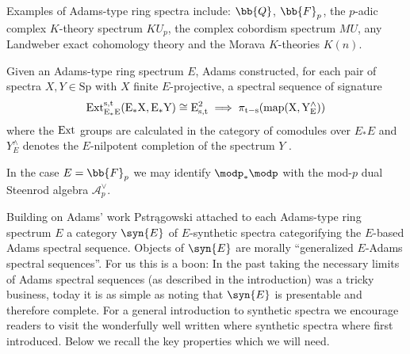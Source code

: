 \begin{ex}
    Examples of Adams-type ring spectra include:
    $\bb{Q}$, 
    $\bb{F}_p$,
    the $p$-adic complex $K$-theory spectrum $KU_p$,
    the complex cobordism spectrum $MU$, 
    any Landweber exact cohomology theory and
    the Morava $K$-theories $K(n)$.
\end{ex}

Given an Adams-type ring spectrum $E$, Adams constructed, for each pair of spectra $X, Y \in \mathrm{Sp}$ with $X$ finite $E$-projective, a spectral sequence of signature
$$ \rm{Ext}^{s,t}_{E_{*}E}(E_{*}X,E_{*}Y) \cong E^{2}_{s,t} \implies \pi_{t-s}(\rm{map}(X,Y^{\wedge}_{E}))$$
where the $\rm{Ext}$ groups are calculated in the category of comodules over $E_{*}E$ and $Y^{\wedge}_{E}$ denotes the $E$-nilpotent completion of the spectrum $Y$ \cite{adams1974stable}.  

\begin{ex}
    In the case $E=\bb{F}_p$ 
    we may identify ${\modp}_{*}\modp$ with the mod-$p$ dual Steenrod algebra $\mathcal{A}^{\vee}_{p}$.    
\end{ex}





Building on Adams' work Pstr\k{a}gowski attached to each Adams-type ring spectrum $E$ a category $\syn{E}$ of $E$-synthetic spectra 
categorifying the $E$-based Adams spectral sequence. Objects of $\syn{E}$ are morally ``generalized $E$-Adams spectral sequences''.
For us this is a boon: In the past taking the necessary limits of Adams spectral sequences (as described in the introduction) was a tricky business, today it is as simple as noting that $\syn{E}$ is presentable and therefore complete.
For a general introduction to synthetic spectra we encourage readers to visit the wonderfully well written \cite{pstrągowski2022synthetic} where synthetic spectra where first introduced.
Below we recall the key properties which we will need.


